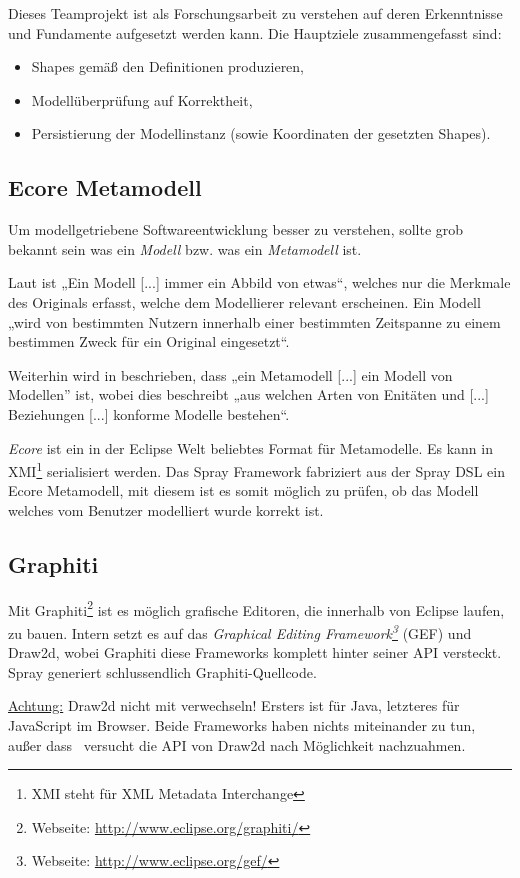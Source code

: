 Dieses Teamprojekt ist als Forschungsarbeit zu verstehen
auf deren Erkenntnisse und Fundamente aufgesetzt werden kann.
Die Hauptziele zusammengefasst sind:

\begin{itemize}
  \item Shapes gemäß den Definitionen produzieren,
  \item Modellüberprüfung auf Korrektheit,
  \item Persistierung der Modellinstanz (sowie Koordinaten der gesetzten Shapes).
\end{itemize}


\subsection{Ecore Metamodell}\label{sec.ecore}

Um modellgetriebene Softwareentwicklung besser zu verstehen,
sollte grob bekannt sein was ein \emph{Modell} bzw. was ein
\emph{Metamodell} ist.

Laut \citep[][S.~2-1]{drachen} ist „Ein Modell [...] immer ein Abbild von etwas“,
welches nur die Merkmale des Originals erfasst, welche dem Modellierer
relevant erscheinen.
Ein Modell „wird von bestimmten Nutzern innerhalb einer bestimmten Zeitspanne
zu einem bestimmen Zweck für ein Original eingesetzt“.

Weiterhin wird in \citep[][S.~2-5]{drachen} beschrieben, dass
„ein Metamodell [...] ein Modell von Modellen” ist, wobei dies beschreibt
„aus welchen Arten von Enitäten und [...] Beziehungen [...] konforme Modelle
bestehen“.

\emph{Ecore} ist ein in der Eclipse Welt beliebtes Format für Metamodelle.
Es kann in XMI\footnote{XMI steht für XML Metadata Interchange} serialisiert
werden. Das Spray Framework fabriziert aus der Spray DSL ein Ecore Metamodell,
mit diesem ist es somit möglich zu prüfen, ob das Modell welches vom
Benutzer modelliert wurde korrekt ist.


\subsection{Graphiti}

Mit Graphiti\footnote{Webseite: \url{http://www.eclipse.org/graphiti/}}
ist es möglich grafische Editoren, die innerhalb von Eclipse laufen, zu bauen.
Intern setzt es auf das \emph{Graphical Editing
Framework\footnote{Webseite: \url{http://www.eclipse.org/gef/}}} (GEF)
und Draw2d, wobei Graphiti diese Frameworks komplett hinter seiner API
versteckt. Spray generiert schlussendlich Graphiti-Quellcode.
\citep[sinngemäß aus][S.~2]{sprayPaper}

\underline{Achtung:}
Draw2d nicht mit \emph{\dd} verwechseln! Ersters ist für Java,
letzteres für JavaScript im Browser. Beide Frameworks haben nichts miteinander
zu tun, außer dass \dd~versucht die API von Draw2d nach Möglichkeit
nachzuahmen.
